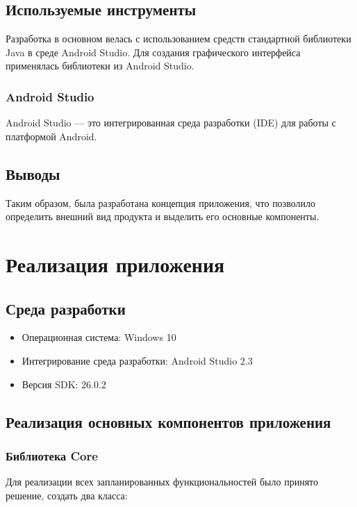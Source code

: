	\subsection{Используемые инструменты}
	
	Разработка в основном велась с использованием средств стандартной библиотеки Java в среде Android Studio. Для создания графического интерфейса применялась библиотеки из Android Studio. 
	
	\subsubsection{Android Studio}
	
	Android Studio — это интегрированная среда разработки (IDE) для работы с платформой Android.
	
	\subsection{Выводы}
	Таким образом, была разработана концепция приложения, что позволило определить внешний вид продукта и выделить его основные компоненты.
	
	\section{Реализация приложения}
	
	\subsection{Среда разработки}
	
	\begin{itemize}
		\item Операционная система: Windows 10
		\item Интегрирование среда разработки: Android Studio 2.3
		\item Версия SDK: 26.0.2
	\end{itemize}
	
	\subsection{Реализация основных компонентов приложения}
	
	\subsubsection{Библиотека Core}
	
	Для реализации всех запланированных функциональностей было принято решение, создать два класса:
	
